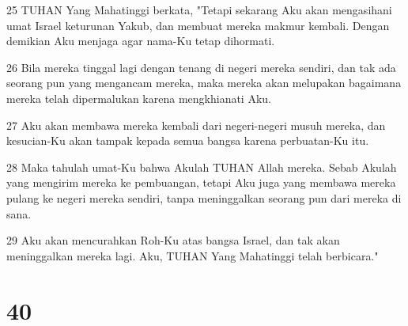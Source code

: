 \par 25 TUHAN Yang Mahatinggi berkata, "Tetapi sekarang Aku akan mengasihani umat Israel keturunan Yakub, dan membuat mereka makmur kembali. Dengan demikian Aku menjaga agar nama-Ku tetap dihormati.
\par 26 Bila mereka tinggal lagi dengan tenang di negeri mereka sendiri, dan tak ada seorang pun yang mengancam mereka, maka mereka akan melupakan bagaimana mereka telah dipermalukan karena mengkhianati Aku.
\par 27 Aku akan membawa mereka kembali dari negeri-negeri musuh mereka, dan kesucian-Ku akan tampak kepada semua bangsa karena perbuatan-Ku itu.
\par 28 Maka tahulah umat-Ku bahwa Akulah TUHAN Allah mereka. Sebab Akulah yang mengirim mereka ke pembuangan, tetapi Aku juga yang membawa mereka pulang ke negeri mereka sendiri, tanpa meninggalkan seorang pun dari mereka di sana.
\par 29 Aku akan mencurahkan Roh-Ku atas bangsa Israel, dan tak akan meninggalkan mereka lagi. Aku, TUHAN Yang Mahatinggi telah berbicara."

\chapter{40}


